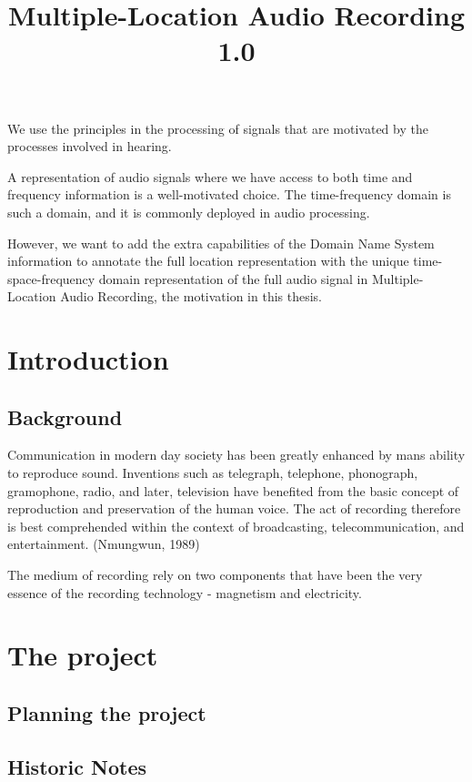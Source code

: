 \documentclass[UKenglish]{ifimaster}  %
\begin{document}
We use the principles in the processing of signals that are motivated
by the processes involved in hearing.

A representation of audio signals where we have access to both time
and frequency information is a well-motivated choice.  The
time-frequency domain is such a domain, and it is commonly deployed
in audio processing.

However, we want to add the extra capabilities of the Domain Name System
information to annotate the full location representation with the unique
time-space-frequency domain representation of the full audio signal in
Multiple-Location Audio Recording, the motivation in this thesis.

\part{Introduction}                   %

\chapter{Background}                  %

Communication in modern day society has been greatly enhanced by mans
ability to reproduce sound.  Inventions such as telegraph, telephone,
phonograph, gramophone, radio, and later, television have benefited
from the basic concept of reproduction and preservation of the human
voice.  The act of recording therefore is best comprehended within the
context of broadcasting, telecommunication, and entertainment. ({Nmungwun, 1989})

The medium of recording rely on two components that have been the very
essence of the recording technology - magnetism and electricity.
\part{The project}                    %

\chapter{Planning the project}        %

\maketitle
\title{Multiple-Location Audio Recording 1.0}
\chapter{Historic Notes}
\end{document}
